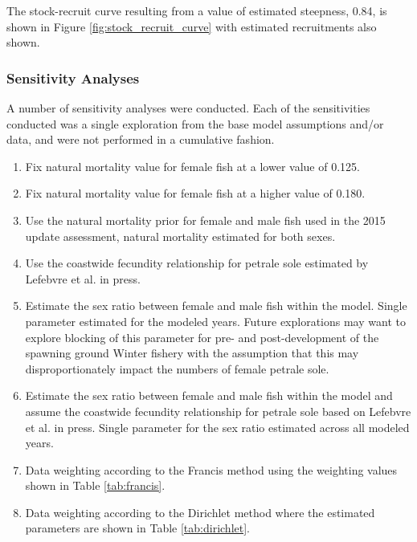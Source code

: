 \documentclass[12pt,]{article}
\begin{document}
The stock-recruit curve resulting from a value of estimated steepness,
0.84, is shown in Figure \ref{fig:stock_recruit_curve} with estimated
recruitments also shown.

\subsubsection{Sensitivity Analyses}\label{sensitivity-analyses}

A number of sensitivity analyses were conducted. Each of the
sensitivities conducted was a single exploration from the base model
assumptions and/or data, and were not performed in a cumulative fashion.

\begin{enumerate}

  \item Fix natural mortality value for female fish at a lower value of 0.125.
  
  \item Fix natural mortality value for female fish at a higher value of 0.180.
  
  \item Use the natural mortality prior for female and male fish used in the 2015 update assessment, natural mortality estimated for both sexes.
  
  \item Use the coastwide fecundity relationship for petrale sole estimated by Lefebvre et al. in press.
  
  \item Estimate the sex ratio between female and male fish within the model. Single parameter estimated for the modeled years.  Future explorations may want to explore blocking of this parameter for pre- and post-development of the spawning ground Winter fishery with the assumption that this may disproportionately impact the numbers of female petrale sole.
  
  \item Estimate the sex ratio between female and male fish within the model and assume the coastwide fecundity relationship for petrale sole based on Lefebvre et al. in press. Single parameter for the sex ratio estimated across all modeled years. 
  
  \item Data weighting according to the Francis method using the weighting values shown in Table \ref{tab:francis}. 
  
  \item Data weighting according to the Dirichlet method where the estimated parameters are shown in Table \ref{tab:dirichlet}. 
  
\end{enumerate}
\end{document}

